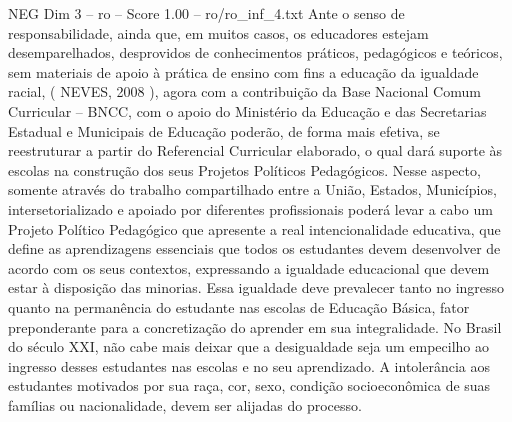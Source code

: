 \begin{textsample}{NEG Dim 3 – ro – Score 1.00 – ro/ro\_inf\_4.txt}
Ante o senso de responsabilidade, ainda que, em muitos casos, os educadores estejam desemparelhados, desprovidos de conhecimentos práticos, pedagógicos e teóricos, sem materiais de apoio à prática de ensino com fins a educação da igualdade racial, ( NEVES, 2008 ), agora com a contribuição da Base Nacional Comum Curricular – BNCC, com o apoio do Ministério da Educação e das Secretarias Estadual e Municipais de Educação poderão, de forma mais efetiva, se reestruturar a partir do Referencial Curricular elaborado, o qual dará suporte às escolas na construção dos seus Projetos Políticos Pedagógicos.
Nesse aspecto, somente através do trabalho compartilhado entre a União, Estados, Municípios, intersetorializado e apoiado por diferentes profissionais poderá levar a cabo um Projeto Político Pedagógico que apresente a real intencionalidade educativa, que define as aprendizagens essenciais que todos os estudantes devem desenvolver de acordo com os seus contextos, expressando a igualdade educacional que devem estar à disposição das minorias.
Essa igualdade deve prevalecer tanto no ingresso quanto na permanência do estudante nas escolas de Educação Básica, fator preponderante para a concretização do aprender em sua integralidade.
No Brasil do século XXI, não cabe mais deixar que a desigualdade seja um empecilho ao ingresso desses estudantes nas escolas e no seu aprendizado.
A intolerância aos estudantes motivados por sua raça, cor, sexo, condição socioeconômica de suas famílias ou nacionalidade, devem ser alijadas do processo.

\end{textsample}
